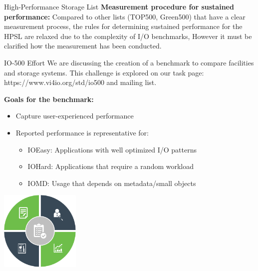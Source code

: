 \documentclass[portrait,a0paper,fontscale=0.4]{baposter}
\begin{document}
\begin{poster}
\begin{posterbox}[name=schedule,column=1,span=2, below=concept]{High-Performance Storage List}
\textbf{Measurement procedure for sustained performance:}
Compared to other lists (TOP500, Green500) that have a clear measurement process, the rules for determining sustained performance for the HPSL are relaxed due to the complexity of I/O benchmarks, However it must be clarified how the measurement has been conducted.
\end{posterbox}

\begin{posterbox}[name=HHCC,column=1,span=2, below=schedule, above=bottom]{IO-500 Effort}
We are discussing the creation of a benchmark to compare facilities and storage systems. This challenge is explored on our task page: https://www.vi4io.org/std/io500 and mailing list. 

\textbf{Goals for the benchmark:}

\vspace*{-0.5em}

\begin{minipage}{10.5cm}
\begin{itemize}
\item Capture user-experienced performance %
\item Reported performance is representative for:
\vspace*{-0.5em}
\begin{itemize}
\item IOEasy: Applications with well optimized I/O patterns
\item IOHard: Applications that require a random workload
\item IOMD: Usage that depends on metadata/small objects
\end{itemize}
\end{itemize}
\end{minipage}
\qquad
\begin{minipage}{4cm}
\includegraphics[width=3.8cm]{border}
\end{minipage}

\vspace*{-1em}


\end{posterbox}
\end{poster}
\end{document}

